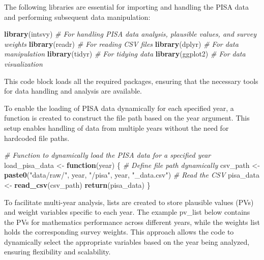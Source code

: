 \documentclass[
]{article}
\newenvironment{Shaded}{\begin{snugshade}}{\end{snugshade}}
\newcommand{\CommentTok}[1]{\textcolor[rgb]{0.56,0.35,0.01}{\textit{#1}}}
\newcommand{\ControlFlowTok}[1]{\textcolor[rgb]{0.13,0.29,0.53}{\textbf{#1}}}
\newcommand{\FunctionTok}[1]{\textcolor[rgb]{0.13,0.29,0.53}{\textbf{#1}}}
\newcommand{\NormalTok}[1]{#1}
\newcommand{\OtherTok}[1]{\textcolor[rgb]{0.56,0.35,0.01}{#1}}
\newcommand{\StringTok}[1]{\textcolor[rgb]{0.31,0.60,0.02}{#1}}
\begin{document}
The following libraries are essential for importing and handling the
PISA data and performing subsequent data manipulation:

\begin{Shaded}
\begin{Highlighting}[]
\FunctionTok{library}\NormalTok{(intsvy)     }\CommentTok{\# For handling PISA data analysis, plausible values, and survey weights}
\FunctionTok{library}\NormalTok{(readr)      }\CommentTok{\# For reading CSV files}
\FunctionTok{library}\NormalTok{(dplyr)      }\CommentTok{\# For data manipulation}
\FunctionTok{library}\NormalTok{(tidyr)      }\CommentTok{\# For tidying data}
\FunctionTok{library}\NormalTok{(ggplot2)    }\CommentTok{\# For data visualization}
\end{Highlighting}
\end{Shaded}

This code block loads all the required packages, ensuring that the
necessary tools for data handling and analysis are available.

To enable the loading of PISA data dynamically for each specified year,
a function is created to construct the file path based on the year
argument. This setup enables handling of data from multiple years
without the need for hardcoded file paths.

\begin{Shaded}
\begin{Highlighting}[]
\CommentTok{\# Function to dynamically load the PISA data for a specified year}
\NormalTok{load\_pisa\_data }\OtherTok{\textless{}{-}} \ControlFlowTok{function}\NormalTok{(year) \{}
    \CommentTok{\# Define file path dynamically}
\NormalTok{    csv\_path }\OtherTok{\textless{}{-}} \FunctionTok{paste0}\NormalTok{(}\StringTok{"data/raw/"}\NormalTok{, year, }\StringTok{"/pisa"}\NormalTok{, year, }\StringTok{"\_data.csv"}\NormalTok{)}
    \CommentTok{\# Read the CSV}
\NormalTok{    pisa\_data }\OtherTok{\textless{}{-}} \FunctionTok{read\_csv}\NormalTok{(csv\_path)}
    \FunctionTok{return}\NormalTok{(pisa\_data)}
\NormalTok{\}}
\end{Highlighting}
\end{Shaded}

To facilitate multi-year analysis, lists are created to store plausible
values (PVs) and weight variables specific to each year. The example
pv\_list below contains the PVs for mathematics performance across
different years, while the weights list holds the corresponding survey
weights. This approach allows the code to dynamically select the
appropriate variables based on the year being analyzed, ensuring
flexibility and scalability.
\end{document}
